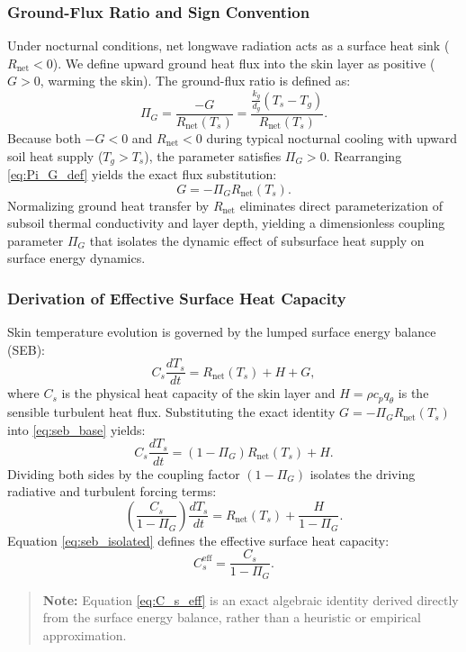 \documentclass[11pt]{article}
\begin{document}
\subsubsection{Ground-Flux Ratio and Sign Convention}
Under nocturnal conditions, net longwave radiation acts as a surface heat sink ($R_{\text{net}} < 0$). We define upward ground heat flux into the skin layer as positive ($G > 0$, warming the skin). The ground-flux ratio is defined as:
\begin{equation}
\Pi_G = \frac{-G}{R_{\text{net}}(T_s)} = \frac{\frac{k_g}{d_g}(T_s - T_g)}{R_{\text{net}}(T_s)}.
\label{eq:Pi_G_def}
\end{equation}
Because both $-G < 0$ and $R_{\text{net}} < 0$ during typical nocturnal cooling with upward soil heat supply ($T_g > T_s$), the parameter satisfies $\Pi_G > 0$. Rearranging \eqref{eq:Pi_G_def} yields the exact flux substitution:
\begin{equation}
G = -\Pi_G R_{\text{net}}(T_s).
\label{eq:exact_G_substitution}
\end{equation}
Normalizing ground heat transfer by $R_{\text{net}}$ eliminates direct parameterization of subsoil thermal conductivity and layer depth, yielding a dimensionless coupling parameter $\Pi_G$ that isolates the dynamic effect of subsurface heat supply on surface energy dynamics.

\subsubsection{Derivation of Effective Surface Heat Capacity}
Skin temperature evolution is governed by the lumped surface energy balance (SEB):
\begin{equation}
C_s \frac{dT_s}{dt} = R_{\text{net}}(T_s) + H + G,
\label{eq:seb_base}
\end{equation}
where $C_s$ is the physical heat capacity of the skin layer and $H = \rho c_p q_\theta$ is the sensible turbulent heat flux. Substituting the exact identity $G = -\Pi_G R_{\text{net}}(T_s)$ into \eqref{eq:seb_base} yields:
\begin{equation}
C_s \frac{dT_s}{dt} = (1 - \Pi_G) R_{\text{net}}(T_s) + H.
\label{eq:seb_substituted}
\end{equation}
Dividing both sides by the coupling factor $(1 - \Pi_G)$ isolates the driving radiative and turbulent forcing terms:
\begin{equation}
\left( \frac{C_s}{1 - \Pi_G} \right) \frac{dT_s}{dt} = R_{\text{net}}(T_s) + \frac{H}{1 - \Pi_G}.
\label{eq:seb_isolated}
\end{equation}
Equation \eqref{eq:seb_isolated} defines the effective surface heat capacity:
\begin{equation}
C_s^{\text{eff}} = \frac{C_s}{1 - \Pi_G}.
\label{eq:C_s_eff}
\end{equation}
\begin{quote}
\textbf{Note:} Equation \eqref{eq:C_s_eff} is an exact algebraic identity derived directly from the surface energy balance, rather than a heuristic or empirical approximation.
\end{quote}
\end{document}
